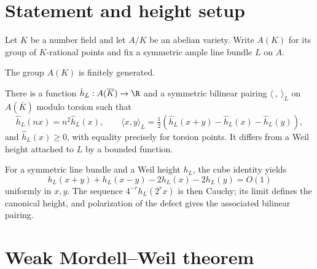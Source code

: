 \section{Statement and height setup}
\label{mumford-AppII-statement}

\begin{convention}
\label{mumford-conv-mordell-weil}
Let $K$ be a number field and let $A/K$ be an abelian variety.  Write
$A(K)$ for its group of $K$-rational points and fix a symmetric ample line
bundle $L$ on $A$.
\notready
\end{convention}

\begin{theorem}
\label{mumford-thm-mordell-weil}
The group $A(K)$ is finitely generated.
\notready
\end{theorem}

\begin{proposition}
\label{mumford-prop-canonical-height}
There is a function $\hat h_L:A(\overline K)\to\R$ and a symmetric bilinear
pairing $\langle\ ,\ \rangle_L$ on $A(\overline K)$ modulo torsion such that
\[
 \hat h_L(nx)=n^2\hat h_L(x),\qquad
 \langle x,y\rangle_L=\tfrac12(\hat h_L(x+y)-\hat h_L(x)-\hat h_L(y)),
\]
and $\hat h_L(x)\ge0$, with equality precisely for torsion points.  It differs
from a Weil height attached to $L$ by a bounded function.
\notready
\end{proposition}

\begin{lemma}
\label{mumford-lem-height-parallelogram}
For a symmetric line bundle and a Weil height $h_L$, the cube identity yields
\[
 h_L(x+y)+h_L(x-y)-2h_L(x)-2h_L(y)=O(1)
\]
uniformly in $x,y$.  The sequence $4^{-r}h_L(2^rx)$ is then Cauchy; its limit
defines the canonical height, and polarization of the defect gives the
associated bilinear pairing.
\notready
\end{lemma}

\section{Weak Mordell--Weil theorem}
\label{mumford-AppII-weak}

